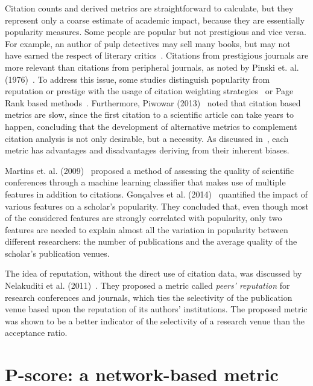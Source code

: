 \documentclass[man]{apa6}
\begin{document}
Citation counts and derived metrics are straightforward to calculate, but they represent only a coarse
estimate of academic impact, because they are essentially popularity measures. Some people are popular but not 
prestigious and vice versa. For example, an author of pulp detectives may sell many books, but may not have earned 
the respect of literary critics~\cite{Bollen2006}. Citations from 
prestigious journals are more relevant than citations from peripheral journals, as noted by
Pinski et. al. (1976)~\cite{Pinski1976}. To address this issue, some studies distinguish popularity from 
reputation or prestige with the usage of citation weighting strategies~\cite{Ding2011, Yan2011a} or 
Page Rank based methods~\cite{Bollen2006, Sun2007}. 
Furthermore, Piwowar (2013)~\cite{Piwowar2013} noted that citation based metrics are slow, since the 
first citation to a scientific article can take years to happen, concluding that the development of 
alternative metrics to complement citation analysis is not only desirable, but a necessity.
As discussed in~\cite{Leydesdorff2009}, each metric has advantages and disadvantages deriving from their 
inherent biases.

Martins et. al. (2009)~\cite{Martins2009} proposed a method of assessing the quality of scientific conferences 
through a machine learning classifier that makes use of multiple features in addition to citations.
Gonçalves et al. (2014)~\cite{Goncalves2014} quantified the impact of various features on a 
scholar's popularity. They concluded that, even though most of the considered features are strongly correlated 
with popularity, only two features are needed to explain almost all the variation in popularity between different 
researchers: the number of publications and the average quality of the scholar’s publication venues. 

The idea of reputation, without the direct use of citation data, was discussed by Nelakuditi et 
al. (2011)~\cite{Nelakuditi2011}. They proposed a metric called \textit{peers' reputation} for 
research conferences and journals, which ties the selectivity of the publication venue based upon 
the reputation of its authors' institutions. The proposed metric was shown to be a better indicator 
of the selectivity of a research venue than the acceptance ratio.

\section{P-score: a network-based metric} 
\label{pscore} 
\end{document}

